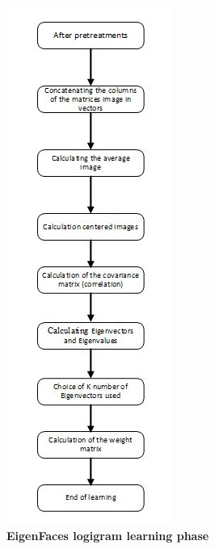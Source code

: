 \begin{figure}[bth]%
\begin{center}
\includegraphics[scale=0.85]{ef_learningphase}%
\caption{\textbf{EigenFaces logigram learning phase}}%
\label{ef_learningphase}%
\end {center}
\end{figure}	


